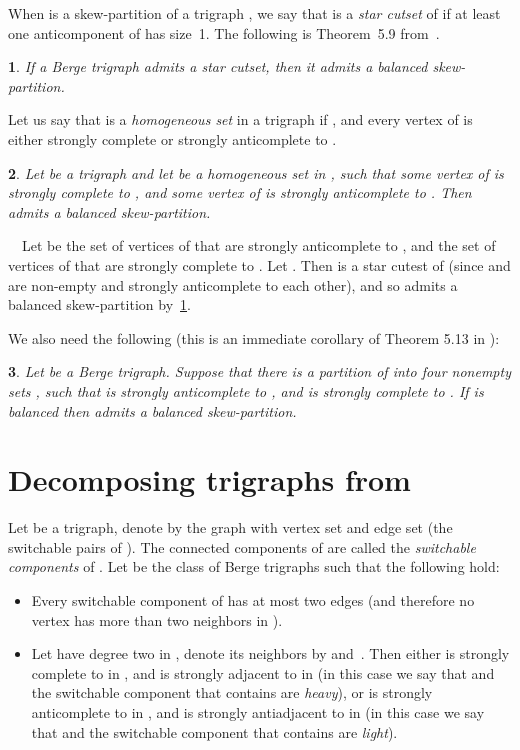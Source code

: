 \documentclass[11 pt] {article}
\newcommand\blackslug{\hbox{\hskip 1pt \vrule width 4pt height 8pt depth 1.5pt
        \hskip 1pt}}
\newcommand\bbox{\hfill \quad \blackslug \medbreak}
\newtheorem{theorem}{}[section]
\newcounter{claim}
\newcommand{\Proof}{\setcounter{claim}{0}\noindent{\bf Proof.}\ \ }
\begin{document}
When  is a skew-partition of a trigraph , we say that  is
a \emph{star cutset} of  if at least one anticomponent of  has size~1.
The following is Theorem~5.9 from~\cite{thesis}.

\begin{theorem}
 \label{starcutset}
 If a Berge trigraph admits a star cutset, then it admits a balanced
 skew-partition.
\end{theorem}


Let us say that  is a \emph{homogeneous set} in
a trigraph  if , and every vertex of  is
either strongly complete or strongly anticomplete to .

\begin{theorem}
\label{lemma}
Let  be a trigraph and let  be a homogeneous set in , 
such that some vertex of  is strongly complete to , and
some vertex of  is strongly anticomplete to . Then
 admits a balanced skew-partition.
\end{theorem}

\Proof Let  be the set of vertices of  that are 
strongly anticomplete to , and  the set of vertices of 
 that are strongly complete to . Let . Then 
 is a star cutest of  (since  and  
are non-empty and strongly anticomplete to each other), and so  
admits a balanced skew-partition by~\ref{starcutset}. \bbox


We also need the following (this is an immediate corollary of Theorem 5.13 in 
\cite{thesis}):
\begin{theorem}
\label{onepair}
Let  be a Berge trigraph.
Suppose that there is a partition of  into four nonempty sets 
, such that  is strongly anticomplete to , and 
is strongly complete to . If  is balanced then  admits a balanced 
skew-partition.
\end{theorem}




\section{Decomposing trigraphs from }
\label{sec:blocks}

Let  be a trigraph, denote by  the graph with vertex set
 and edge set  (the switchable pairs of ).  The
connected components of  are called the \emph{switchable
  components} of .  Let  be the class of Berge
trigraphs such that the following hold:
\begin{itemize}
\item Every switchable component of  has at most two edges (and
therefore no vertex has more than two neighbors in ).
\item Let  have degree two in , denote its
neighbors by  and~. Then either  is strongly complete to
 in , and  is strongly adjacent to
 in  (in this case we say that  and the switchable component
that contains  are {\em heavy}), or  is
strongly anticomplete to  in , and 
is strongly antiadjacent to  in  (in this case we say that 
and the switchable component that contains  are {\em light}).
\end{itemize} 
\end{document}
